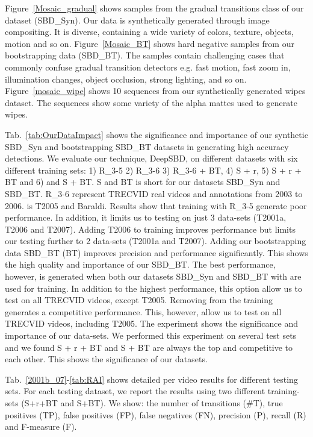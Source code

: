 \documentclass[journal]{IEEEtran}
\begin{document}
Figure~\ref{Mosaic_gradual} shows samples from the gradual transitions class of our dataset (SBD\_Syn). Our data is synthetically generated through image compositing. It is diverse, containing a wide variety of colors, texture, objects, motion and so on. Figure~\ref{Mosaic_BT} shows hard negative samples from our bootstrapping data (SBD\_BT). The samples contain challenging cases that commonly confuse gradual transition detectors e.g. fast motion, fast zoom in, illumination changes, object occlusion, strong lighting, and so on. Figure~\ref{mosaic_wipe} shows 10 sequences from our synthetically generated wipes dataset. The sequences show some variety of the alpha mattes used to generate wipes. 
 





Tab.~\ref{tab:OurDataImpact} shows the significance and importance of our synthetic SBD\_Syn and bootstrapping SBD\_BT datasets in generating high accuracy detections. We evaluate our technique, DeepSBD, on different datasets with six different training sets: 1) R\_3-5 2) R\_3-6 3) R\_3-6 + BT, 4) S + r, 5) S + r + BT and 6) and S + BT. S and BT is short for our datasets SBD\_Syn and SBD\_BT. R\_3-6 represent TRECVID real videos and annotations from 2003 to 2006.  is T2005 and Baraldi. Results show that training with R\_3-5  generate poor performance. In addition, it limits us to testing on just 3 data-sets (T2001a, T2006 and T2007). Adding T2006 to training improves performance but limits our testing further to 2 data-sets (T2001a and T2007). Adding our bootstrapping data SBD\_BT (BT) improves precision and performance significantly. This shows the high quality and importance of our SBD\_BT. The best performance, however, is generated when both our datasets SBD\_Syn and SBD\_BT with  are used for training. In addition to the highest performance, this option allow us to test on all TRECVID videos, except T2005. Removing  from the training generates a competitive performance. This, however, allow us to test on all TRECVID videos, including T2005. The experiment shows the significance and importance of our data-sets. We performed this experiment on several test sets and we found S + r + BT and S + BT are always the top and competitive to each other. This shows the significance of our datasets. 

Tab.~\ref{2001b_07}-\ref{tab:RAI} shows detailed per video results for different testing sets. For each testing dataset, we report the results using two different training-sets (S+r+BT and S+BT). We show: the number of transitions (\#T), true positives (TP), false positives (FP), false negatives (FN), precision (P), recall (R) and F-measure (F).
\end{document}
